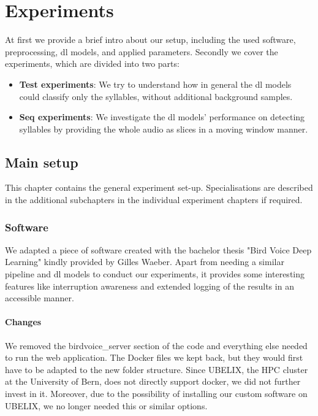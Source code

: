 \chapter{Experiments}
\label{ch:experiments}
At first we provide a brief intro about our setup, including the used software, preprocessing, \gls{dl} models, and applied parameters. Secondly we cover the experiments, which are divided into two parts:
\begin{itemize}
    \item \textbf{Test experiments}: We try to understand how in general the \gls{dl} models could classify only the syllables, without additional background samples.
    \item \textbf{Seq experiments}: We investigate the \gls{dl} models' performance on detecting syllables by providing the whole audio as slices in a moving window manner.
\end{itemize}

\section{Main setup}
This chapter contains the general experiment set-up. Specialisations are described in the additional subchapters in the individual experiment chapters if required.

\subsection{Software}
We adapted a piece of software created with the bachelor thesis "Bird Voice Deep Learning" \cite{Waeber2019BirdLearning} kindly provided by Gilles Waeber.
Apart from needing a similar pipeline and \gls{dl} models to conduct our experiments, it provides some interesting features like interruption awareness and extended logging of the results in an accessible manner.

\subsubsection{Changes}
We removed the birdvoice\_server section of the code and everything else needed to run the web application.
The Docker files we kept back, but they would first have to be adapted to the new folder structure.
Since UBELIX, the HPC cluster at the University of Bern, does not directly support docker, we did not further invest in it.
Moreover, due to the possibility of installing our custom software on UBELIX, we no longer needed this or similar options.

